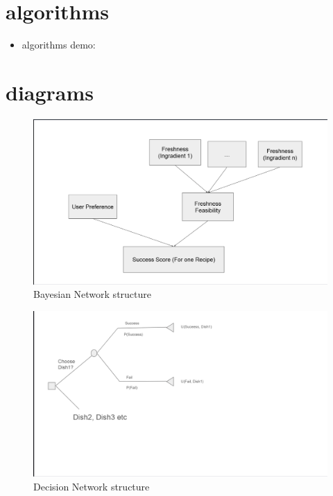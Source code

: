 \section{algorithms}
\begin{itemize}
    \item algorithms demo: 
\end{itemize}
\newpage
\section{diagrams}

\begin{figure}[h]
    \centering
    \includegraphics[width=1.0\textwidth]{appendix/Image/BN.png}
    \caption{Bayesian Network structure}
    \label{fig:BN}
\end{figure}

\begin{figure}[h]
    \centering
    \includegraphics[width=1.0\textwidth]{appendix/Image/Decision-Network.png}
    \caption{Decision Network structure}
    \label{fig:DN}
\end{figure}
